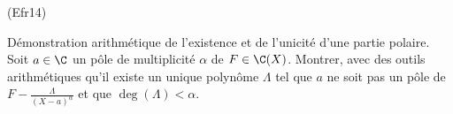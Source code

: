 \begin{tiny}(Efr14)\end{tiny} Démonstration arithmétique de l'existence et de l'unicité d'une partie polaire.\newline
Soit $a\in \C$ un pôle de multiplicité $\alpha$ de $F\in \C(X)$. Montrer, avec des outils arithmétiques qu'il existe un unique polynôme $\Lambda$ tel que $a$ ne soit pas un pôle de $F-\frac{\Lambda}{(X-a)^\alpha}$ et que $\deg(\Lambda) < \alpha$.
